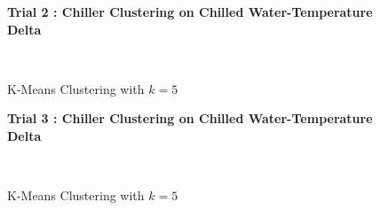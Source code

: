 \begin{figure}[!h]
\centerline{\bfseries\Large Trial 2 : Chiller Clustering on Chilled Water-Temperature Delta}\\
\caption{K-Means Clustering with $k=5$}
\end{figure}
\begin{figure}[!h]
\centerline{\bfseries\Large Trial 3 : Chiller Clustering on Chilled Water-Temperature Delta}\\
\caption{K-Means Clustering with $k=5$}
\end{figure}
